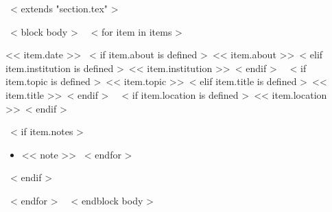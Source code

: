 ~< extends "section.tex" >~

~< block body >~
  ~< for item in items >~
    \begin{samepage}
      \cventry
        {<< item.date >>}
        {~< if item.about is defined >~<< item.about >>~< elif item.institution is defined >~<< item.institution >>~< endif >~}
        {~< if item.topic is defined >~<< item.topic >>~< elif item.title is defined >~<< item.title >>~< endif >~}
        {~< if item.location is defined >~<< item.location >>~< endif >~}
        {}
        { %
          ~< if item.notes >~
            \begin{itemize}
              ~< for note in item.notes >~
                \item{<< note >>}
              ~< endfor >~
            \end{itemize}
          ~< endif >~
        }
    \end{samepage}
    \vspace{10pt}
  ~< endfor >~
  \vspace{-10pt}
~< endblock body >~
